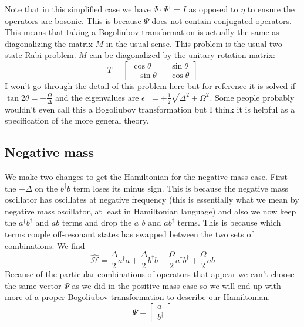 \documentclass[12pt]{article}
\begin{document}
Note that in this simplified case we have $\Psi \cdot \Psi^{\dag} = I$ as opposed to $\eta$ to ensure the operators are bosonic. This is because $\Psi$ does not contain conjugated operators. This means that taking a Bogoliubov transformation is actually the same as diagonalizing the matrix $M$ in the usual sense. This problem is the usual two state Rabi problem. $M$ can be diagonalized by the unitary rotation matrix:
\begin{equation}
\label{trig}
T =
\begin{bmatrix}
\cos{\theta} && \sin{\theta}\\
-\sin{\theta} && \cos{\theta}
\end{bmatrix}
\end{equation}
I won't go through the detail of this problem here but for reference it is solved if $\tan{2\theta} = -\frac{\Omega}{\Delta}$ and the eigenvalues are $\epsilon_{\pm} = \pm \frac{1}{2}\sqrt{\Delta^2 +\Omega^2}$. Some people probably wouldn't even call this a Bogoliubov transformation but I think it is helpful as a specification of the more general theory.
\subsection{Negative mass}
We make two changes to get the Hamiltonian for the negative mass case. First the $-\Delta$ on the $b^{\dag}b$ term loses its minus sign. This is because the negative mass oscillator has oscillates at negative frequency (this is essentially what we mean by negative mass oscillator, at least in Hamiltonian language) and also we now keep the $a^\dag b^\dag$ and $ab$ terms and drop the $a^\dag b$ and $a b^\dag$ terms. This is because which terms couple off-resonant states has swapped between the two sets of combinations. We find
\begin{equation}\hat{\mathcal{H}} = \frac{\Delta}{2} a^{\dagger}a + \frac{\Delta}{2} b^\dag b + \frac{\Omega}{2} a^\dag b^{\dag} + \frac{\Omega}{2} ab\end{equation}
Because of the particular combinations of operators that appear we can't choose the same vector $\Psi$ as we did in the positive mass case so we will end up with more of a proper Bogoliubov transformation to describe our Hamiltonian.
\begin{equation}
\Psi = 
\begin{bmatrix}
a\\b^{\dag}
\end{bmatrix}
\end{equation}
\end{document}
